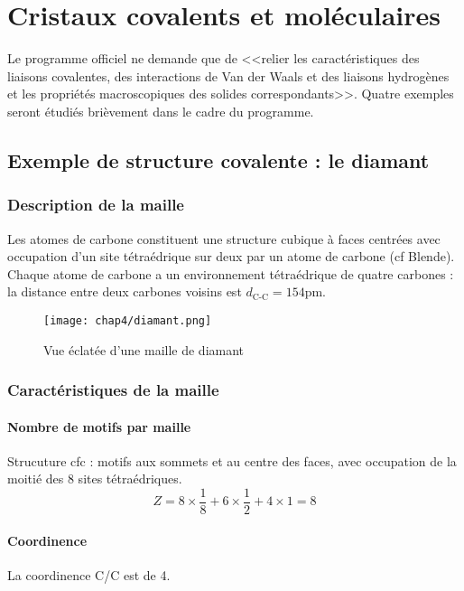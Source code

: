 \chapter{Cristaux covalents et moléculaires}
Le programme officiel ne demande que de <<relier les caractéristiques des liaisons
covalentes, des interactions de Van der Waals et des liaisons hydrogènes et les
propriétés macroscopiques des solides correspondants>>. Quatre exemples seront étudiés
brièvement dans le cadre du programme.

\section{Exemple de structure covalente : le diamant }
\subsection{Description de la maille}
Les atomes de carbone constituent une structure cubique à faces centrées avec
occupation d’un site tétraédrique sur deux par un atome de carbone (cf Blende). Chaque
atome de carbone a un environnement tétraédrique de quatre carbones : la distance
entre deux carbones voisins est $d_\text{C-C} = 154$pm.

\begin{figure}
    \centering
    \texttt{[image: chap4/diamant.png]}
    \caption{Vue éclatée d'une maille de diamant}\label{fig:4_diamant_eclatee}
\end{figure}

\subsection{Caractéristiques de la maille}
\subsubsection{Nombre de motifs par maille}
Strucuture cfc : motifs aux sommets et au centre des faces, avec occupation de la
moitié des 8 sites tétraédriques.
\begin{equation}
    Z = 8 \times \frac{1}{8} + 6 \times \frac{1}{2} + 4 \times 1 = 8
\end{equation}

\subsubsection{Coordinence}
La coordinence C/C est de 4.

